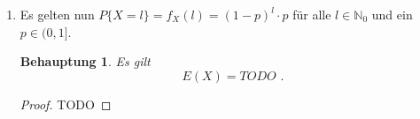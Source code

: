 \documentclass[a4paper]{scrartcl}
\newtheorem*{behaupt}{Behauptung}
\begin{document}
\begin{enumerate}[label=\bfseries\arabic*.]
\begin{enumerate}[label=(\alph*)]
            \item
                Es gelten nun $P\{X = l\} = f_X(l) = (1 - p)^l \cdot p$ für alle
                $l \in \mathbb{N}_0$ und ein $p \in (0, 1]$.
                \begin{behaupt}
                    Es gilt
                    \begin{equation*}
                        E(X) = TODO
                        \text{ .}
                    \end{equation*}
                \end{behaupt}
                \begin{proof}
                    TODO
                \end{proof}

        \end{enumerate}
\end{enumerate}
\end{document}
